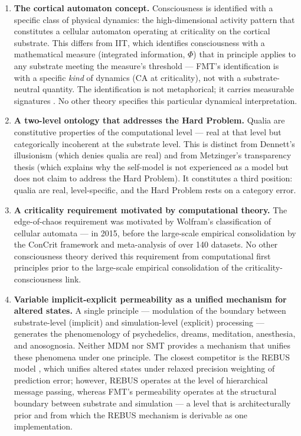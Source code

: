 \documentclass[12pt]{article}
\newcommand{\rev}[1]{#1}
\begin{document}
\begin{enumerate}
\item \textbf{The cortical automaton concept.} Consciousness is identified with a specific class of physical dynamics: the high-dimensional activity pattern that constitutes a cellular automaton operating at criticality on the cortical substrate. This differs from IIT, which identifies consciousness with a mathematical measure (integrated information, $\Phi$) that in principle applies to any substrate meeting the measure's threshold --- FMT's identification is with a specific \emph{kind} of dynamics (CA at criticality), not with a substrate-neutral quantity. The identification is not metaphorical; it carries measurable signatures \citep{Gruber2015}. No other theory specifies this particular dynamical interpretation.
\item \textbf{A two-level ontology that addresses the Hard Problem.} Qualia are constitutive properties of the computational level --- real at that level but categorically incoherent at the substrate level. This is distinct from Dennett's illusionism (which denies qualia are real) and from Metzinger's transparency thesis (which explains why the self-model is not experienced as a model but does not claim to address the Hard Problem). It constitutes a third position: qualia are real, level-specific, and the Hard Problem rests on a category error.
\item \textbf{A criticality requirement \rev{motivated} by computational theory.} The edge-of-chaos requirement was \rev{motivated} by Wolfram's classification of cellular automata \citep{Wolfram2002} --- in 2015, \rev{before the large-scale empirical consolidation} by the ConCrit framework \citep{AlgomShriki2026} and \citet{HengenShew2025} meta-analysis of over 140 datasets. No other consciousness theory derived this requirement from computational first principles prior to \rev{the large-scale empirical consolidation of the criticality-consciousness link}.
\item \textbf{Variable implicit-explicit permeability as a unified mechanism for altered states.} A single principle --- modulation of the boundary between substrate-level (implicit) and simulation-level (explicit) processing --- generates the phenomenology of psychedelics, dreams, meditation, anesthesia, and anosognosia. Neither MDM nor SMT provides a mechanism that unifies these phenomena under one principle. The closest competitor is the REBUS model \citep{CarhartHarris2019}, which unifies altered states under relaxed precision weighting of prediction error; however, REBUS operates at the level of hierarchical message passing, whereas FMT's permeability operates at the structural boundary between substrate and simulation --- a level that is architecturally prior and from which the REBUS mechanism is derivable as one implementation.

\end{enumerate}
\end{document}
